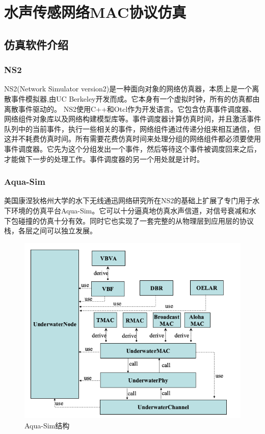 \chapter{水声传感网络MAC协议仿真}
\section {仿真软件介绍}
\subsection{NS2}
NS2(Network Simulator version2)是一种面向对象的网络仿真器，本质上是一个离散事件模拟器,由UC Berkeley开发而成。它本身有一个虚拟时钟，所有的仿真都由离散事件驱动的。
NS2使用C++和Otcl作为开发语言。它包含仿真事件调度器、网络组件对象库以及网络构建模型库等。事件调度器计算仿真时间，并且激活事件队列中的当前事件，执行一些相关的事件，网络组件通过传递分组来相互通信，但这并不耗费仿真时间。所有需要花费仿真时间来处理分组的网络组件都必须要使用事件调度器。它先为这个分组发出一个事件，然后等待这个事件被调度回来之后，才能做下一步的处理工作。事件调度器的另一个用处就是计时。

\subsection{Aqua-Sim}
美国康涅狄格州大学的水下无线通迅网络研究所在NS2的基础上扩展了专门用于水下环境的仿真平台Aqua-Sim\cite{xie2009aqua}。它可以十分逼真地仿真水声信道，对信号衰减和水下包碰撞的仿真十分有效。同时它也实现了一套完整的从物理层到应用层的协议栈，各层之间可以独立发展。

 \begin{figure}[!ht]
 	\centering
 	\includegraphics[scale=0.5]{figures/aq.png}
 	\caption{
 		Aqua-Sim结构
 	}
 	\label{fig:example}
 \end{figure}
